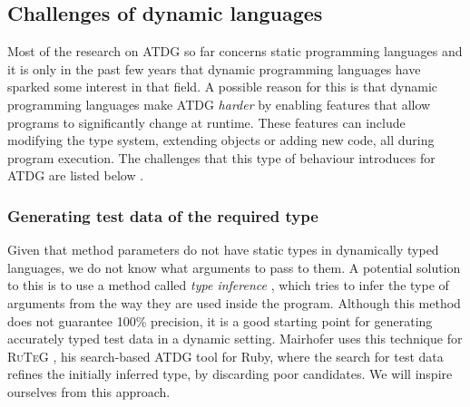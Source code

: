 




\subsection{Challenges of dynamic languages}

Most of the research on ATDG so far concerns static programming languages \cite{mahmood2007systematic} and it is only in the past few years that dynamic programming languages have sparked some interest in that field. A possible reason for this is that dynamic programming languages make ATDG \emph{harder} by enabling features that allow programs to significantly change at runtime. These features can include modifying the type system, extending objects or adding new code, all during program execution. The challenges that this type of behaviour introduces for ATDG are listed below \cite{ducasse2011challenges}.

\subsubsection{Generating test data of the required type}
Given that method parameters do not have static types in dynamically typed languages, we do not know what arguments to pass to them. A potential solution to this is to use a method called \emph{type inference} \cite{pluquet2009fast}, which tries to infer the type of arguments from the way they are used inside the program. Although this method does not guarantee 100\% precision, it is a good starting point for generating accurately typed test data in a dynamic setting. Mairhofer uses this technique for \textsc{\small RuTeG} \cite{mairhofer2008search}, his search-based ATDG tool for Ruby, where the search for test data refines the initially inferred type, by discarding poor candidates. We will inspire ourselves from this approach.

